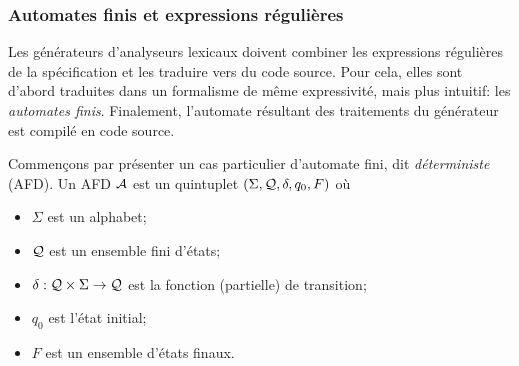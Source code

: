 %
\begin{frame}
\frametitle{Automates finis et expressions régulières}

Les générateurs d'analyseurs lexicaux doivent combiner les expressions
régulières de la spécification et les traduire vers du code
source. Pour cela, elles sont d'abord traduites dans un formalisme de
même expressivité, mais plus intuitif: les \emph{automates
finis}. Finalement, l'automate résultant des traitements du générateur
est compilé en code source.

Commençons par présenter un cas particulier d'automate fini, dit
\emph{déterministe} (AFD). Un AFD ${\cal A}$ est un quintuplet
$(\Sigma, {\cal Q}, \delta, q_0, F)$ où

\begin{itemize}

  \item $\Sigma$ est un alphabet;

  \item ${\cal Q}$ est un ensemble fini d'états;

  \item $\delta : {\cal Q} \times \Sigma \rightarrow {\cal Q}$ est la
  fonction (partielle) de transition;

  \item $q_0$ est l'état initial;

  \item $F$ est un ensemble d'états finaux.

\end{itemize}

\end{frame}


